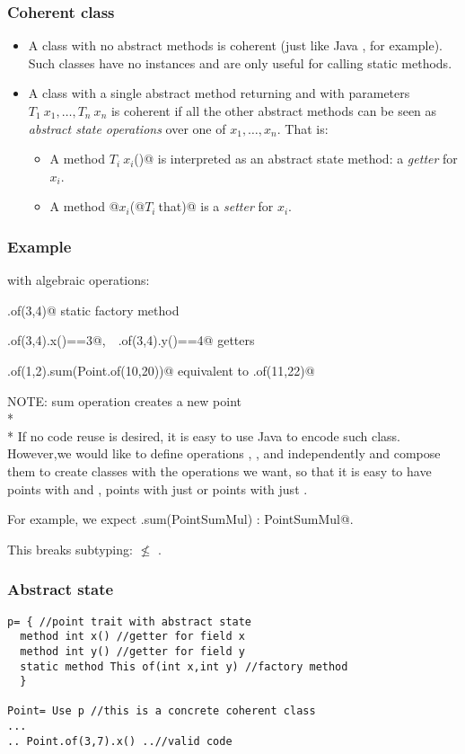 \begin{frame}[fragile]
\frametitle{Coherent class}
\begin{itemize}
\item A class with no abstract methods is coherent (just like Java
  \Q@Math@, for example). Such classes have no instances and are only useful for calling static methods.
\item A class with a single abstract \Q@static@ method 
returning \Q@This@ and with parameters $T_1\ x_1, \ldots, T_n\ x_n$
is coherent if all the other abstract methods can be seen as \emph{abstract state
operations} over one of $x_1, \ldots, x_n$.
That is:
\begin{itemize}
\item A method $T_i\ x_i$\Q@()@ is interpreted as an abstract state method: a \emph{getter} for $x_i$.
\item A method \Q@void @$x_i$\Q@(@$T_i\ $\Q@ that)@ is a \emph{setter} for $x_i$.
\end{itemize}
\end{itemize}
\end{frame}


\begin{frame}[fragile]
\frametitle{Example}
\Q@Point@s with algebraic operations:

\Q@Point.of(3,4)@  static factory method

\Q@Point.of(3,4).x()==3@,\ \   \Q@Point.of(3,4).y()==4@ getters

\Q@Point.of(1,2).sum(Point.of(10,20))@ equivalent to \Q@Point.of(11,22)@

NOTE: sum operation creates a new point
\\*${}_{}$\\*
If no code reuse is desired, it is easy to use Java to encode such \Q@Point@ class.
However,we would like to define operations \Q@sum@, \Q@mul@, \Q@div@ and \Q@sub@
independently and compose them to create classes with the operations we want,
so that it is easy to have points with \Q@sum@ and \Q@mul@, points with
just \Q@sum@ or points with just \Q@mul@.

For example, we expect \Q@PointSumMul.sum(PointSumMul) : PointSumMul@.

This breaks subtyping: \Q@PointSumMul@ $\not\leq$ \Q@PointSum@.


\end{frame}

\begin{frame}[fragile]
\frametitle{Abstract state}
\begin{lstlisting}
p= { //point trait with abstract state
  method int x() //getter for field x
  method int y() //getter for field y
  static method This of(int x,int y) //factory method
  }

Point= Use p //this is a concrete coherent class
...
.. Point.of(3,7).x() ..//valid code
\end{lstlisting}
\end{frame}


